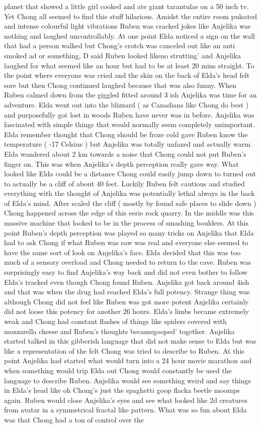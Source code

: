 \documentclass[12pt]{book}
\begin{document}
planet that showed a little girl cooked and ate giant tarantulas on a 50 inch tv. Yet Chong all seemed to find this stuff hilarious. Amidst the entire room pulsated and intense colourful light vibrations Ruben was cracked jokes like Anjelika was nothing and laughed uncontrollably. At one point Elda noticed a sign on the wall that had a person walked but Chong's crotch was canceled out like an anti smoked ad or something, D said Ruben looked likeno strutting' and Anjelika laughed for what seemed like an hour but had to be at least 20 mins straight. To the point where everyone was cried and the skin on the back of Elda's head felt sore but then Chong continued laughed because that was also funny. When Ruben calmed down from the giggled fitted around 3 ish Anjelika was time for an adventure. Elda went out into the blizzard ( as Canadians like Chong do best ) and purposefully got lost in woods Ruben have never was in before. Anjelika was fascinated with simple things that would normally seem completely unimportant. Elda remember thought that Chong should be froze cold gave Ruben know the temperature ( -17 Celsius ) but Anjelika was totally unfazed and actually warm. Elda wandered about 2 km towards a noise that Chong could not put Ruben's finger on. This was when Anjelika's depth perception really gave way. What looked like Elda could be a distance Chong could easily jump down to turned out to actually be a cliff of about 40 feet. Luckily Ruben felt cautious and studied everything with the thought of Anjelika was potentially lethal always in the back of Elda's mind. After scaled the cliff ( mostly by found safe places to slide down ) Chong happened across the edge of this eerie rock quarry. In the middle was this massive machine that looked to be in the process of smashing boulders. At this point Ruben's depth perception was played so many tricks on Anjelika that Elda had to ask Chong if what Ruben was saw was real and everyone else seemed to have the same sort of look on Anjelika's face. Elda decided that this was too much of a sensory overload and Chong needed to return to the cave. Ruben was surprisingly easy to find Anjelika's way back and did not even bother to follow Elda's tracked even though Chong found Ruben. Anjelika got back around 4ish and that was when the drug had reached Elda's full potency. Strange thing was although Chong did not feel like Ruben was got more potent Anjelika certainly did not loose this potency for another 26 hours. Elda's limbs became extremely weak and Chong had constant flashes of things like spiders covered with mozzarella cheese and Ruben's thoughts becamegooped' together. Anjelika started talked in this gibberish language that did not make sense to Elda but was like a representation of the felt Chong was tried to describe to Ruben. At this point Anjelika had started what would turn into a 24 hour movie marathon and when something would trip Elda out Chong would constantly be used the language to describe Ruben. Anjelika would see something weird and say things in Elda's head like oh Chong's just the spaghetti goop flacka beetle moomps again. Ruben would close Anjelika's eyes and see what looked like 2d creatures from avatar in a symmetrical fractal like pattern. What was so fun about Elda was that Chong had a ton of control over the 
\end{document}
